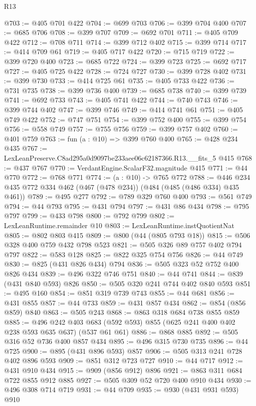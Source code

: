\begin{lexlean}{R13}
\begin{coremodule}
@703 := @405 @701 @422
@704 := @699 @703
@706 := @399 @704 @400
@707 := @685 @706
@708 := @399 @707
@709 := @692 @701
@711 := @405 @709 @422
@712 := @708 @711
@714 := @399 @712 @402
@715 := @399 @714
@717 := @414 @709 @61
@719 := @405 @717 @422
@720 := @715 @719
@722 := @399 @720 @400
@723 := @685 @722
@724 := @399 @723
@725 := @692 @717
@727 := @405 @725 @422
@728 := @724 @727
@730 := @399 @728 @402
@731 := @399 @730
@733 := @414 @725 @61
@735 := @405 @733 @422
@736 := @731 @735
@738 := @399 @736 @400
@739 := @685 @738
@740 := @399 @739
@741 := @692 @733
@743 := @405 @741 @422
@744 := @740 @743
@746 := @399 @744 @402
@747 := @399 @746
@749 := @414 @741 @61
@751 := @405 @749 @422
@752 := @747 @751
@754 := @399 @752 @400
@755 := @399 @754
@756 := @558 @749
@757 := @755 @756
@759 := @399 @757 @402
@760 := @401 @759
@763 := fun (a : @10) => @399 @760 @400
@765 := @428 @234 @435
@767 := LexLeanPreserve.C8ad295a0d9097be233aee06c62187366.R13.__fits_5 @415
@768 := @437 @767
@770 := VerdantEngine.ScalarF32.magnitude @415
@771 := @44 @770
@772 := @768 @771
@774 := (a : @10) -> @765 @772
@788 := @446 @234 @435 @772 @334 @462 (@467 (@478 @234)) (@484 (@485 (@486 @334) @435 @461))
@789 := @495 @277
@792 := @789 @329 @760 @400
@793 := @561 @749
@794 := @44 @793
@795 := @431 @794
@797 := @431 @86 @434
@798 := @795 @797
@799 := @433 @798
@800 := @792 @799
@802 := LexLeanRuntime.remainder @10
@803 := LexLeanRuntime.instQuotientNat
@805 := @802 @803 @415
@809 := @800 (@44 (@805 @793 @18))
@815 := @506 @328 @400 @759 @432 @798 @523
@821 := @505 @326 @89 @757 @402 @794 @797
@822 := @583 @128
@825 := @822 @325 @754 @756
@826 := @44 @749
@830 := @825 (@431 @826 @434) @794
@836 := @505 @323 @52 @752 @400 @826 @434
@839 := @496 @322 @746 @751
@840 := @44 @741
@844 := @839 (@431 @840 @593) @826
@850 := @505 @320 @241 @744 @402 @840 @593
@851 := @495 @160
@854 := @851 @319 @739 @743
@855 := @44 @681
@856 := @431 @855
@857 := @44 @733
@859 := @431 @857 @434
@862 := @854 (@856 @859) @840
@863 := @505 @243
@868 := @863 @318 @684 @738 @855 @859
@885 := @496
    @242
    @403
    @683
    (@592 @593)
    @855
    (@625 @241 @400 @402 @238 @593 @635 @637)
    (@537 @61 @61)
@886 := @868 @885
@892 := @505 @316 @52 @736 @400 @857 @434
@895 := @496 @315 @730 @735
@896 := @44 @725
@900 := @895 (@431 @896 @593) @857
@906 := @505 @313 @241 @728 @402 @896 @593
@909 := @851 @312 @723 @727
@910 := @44 @717
@912 := @431 @910 @434
@915 := @909 (@856 @912) @896
@921 := @863 @311 @684 @722 @855 @912 @885
@927 := @505 @309 @52 @720 @400 @910 @434
@930 := @496 @308 @714 @719
@931 := @44 @709
@935 := @930 (@431 @931 @593) @910

\end{coremodule}
\end{lexlean}
